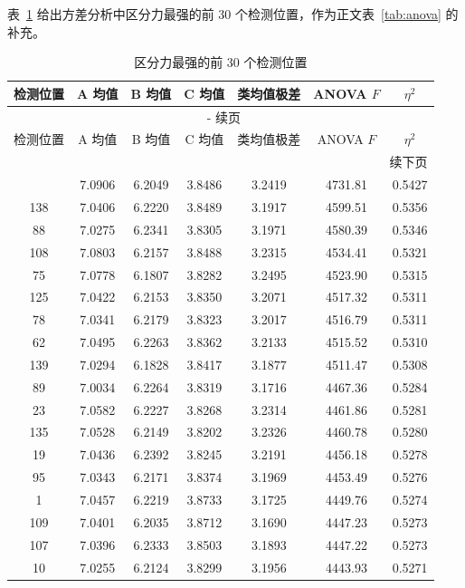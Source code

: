 \documentclass[12pt,a4paper]{article}
\renewcommand{\thetable}{\arabic{section}-\arabic{table}}
\begin{document}
表~\ref{tab:anova30} 给出方差分析中区分力最强的前 30 个检测位置，作为正文表~\ref{tab:anova} 的补充。

\begin{longtable}{ccccccc}
\caption{区分力最强的前 30 个检测位置}\label{tab:anova30}\\
\toprule
检测位置 & A 均值 & B 均值 & C 均值 & 类均值极差 & ANOVA $F$ & $\eta^2$ \\
\midrule
\endfirsthead
\multicolumn{7}{c}{{\tablename\ \thetable{} 续页}}\\
\toprule
检测位置 & A 均值 & B 均值 & C 均值 & 类均值极差 & ANOVA $F$ & $\eta^2$ \\
\midrule
\endhead
\midrule
\multicolumn{7}{r}{{续下页}}\\
\endfoot
\bottomrule
\endlastfoot
134 & 7.0906 & 6.2049 & 3.8486 & 3.2419 & 4731.81 & 0.5427 \\
138 & 7.0406 & 6.2220 & 3.8489 & 3.1917 & 4599.51 & 0.5356 \\
88  & 7.0275 & 6.2341 & 3.8305 & 3.1971 & 4580.39 & 0.5346 \\
108 & 7.0803 & 6.2157 & 3.8488 & 3.2315 & 4534.41 & 0.5321 \\
75  & 7.0778 & 6.1807 & 3.8282 & 3.2495 & 4523.90 & 0.5315 \\
125 & 7.0422 & 6.2153 & 3.8350 & 3.2071 & 4517.32 & 0.5311 \\
78  & 7.0341 & 6.2179 & 3.8323 & 3.2017 & 4516.79 & 0.5311 \\
62  & 7.0495 & 6.2263 & 3.8362 & 3.2133 & 4515.52 & 0.5310 \\
139 & 7.0294 & 6.1828 & 3.8417 & 3.1877 & 4511.47 & 0.5308 \\
89  & 7.0034 & 6.2264 & 3.8319 & 3.1716 & 4467.36 & 0.5284 \\
23  & 7.0582 & 6.2227 & 3.8268 & 3.2314 & 4461.86 & 0.5281 \\
135 & 7.0528 & 6.2149 & 3.8202 & 3.2326 & 4460.78 & 0.5280 \\
19  & 7.0436 & 6.2392 & 3.8245 & 3.2191 & 4456.18 & 0.5278 \\
95  & 7.0343 & 6.2171 & 3.8374 & 3.1969 & 4453.49 & 0.5276 \\
1   & 7.0457 & 6.2219 & 3.8733 & 3.1725 & 4449.76 & 0.5274 \\
109 & 7.0401 & 6.2035 & 3.8712 & 3.1690 & 4447.23 & 0.5273 \\
107 & 7.0396 & 6.2333 & 3.8503 & 3.1893 & 4447.22 & 0.5273 \\
10  & 7.0255 & 6.2124 & 3.8299 & 3.1956 & 4443.93 & 0.5271 \\

\end{longtable}
\end{document}
